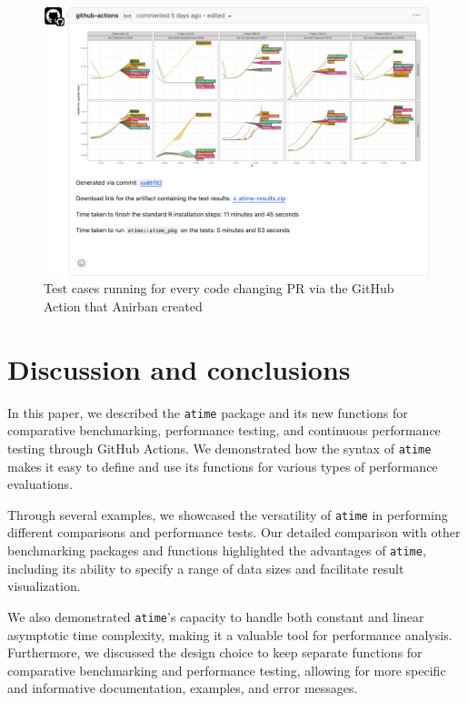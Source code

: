 \begin{figure}[H]
    \centering
    \includegraphics[width=1.0\linewidth]{figures/GHA2.png}
    \caption{Test cases running for every code changing PR via the GitHub Action that Anirban created}
    \label{fig:label5}
\end{figure}


\section{Discussion and conclusions}

In this paper, we described the \texttt{atime} package and its new functions for comparative benchmarking, performance testing, and continuous performance testing through GitHub Actions. We demonstrated how the syntax of \texttt{atime} makes it easy to define and use its functions for various types of performance evaluations.

Through several examples, we showcased the versatility of \texttt{atime} in performing different comparisons and performance tests. Our detailed comparison with other benchmarking packages and functions highlighted the advantages of \texttt{atime}, including its ability to specify a range of data sizes and facilitate result visualization.

We also demonstrated \texttt{atime}'s capacity to handle both constant and linear asymptotic time complexity, making it a valuable tool for performance analysis. Furthermore, we discussed the design choice to keep separate functions for comparative benchmarking and performance testing, allowing for more specific and informative documentation, examples, and error messages.

